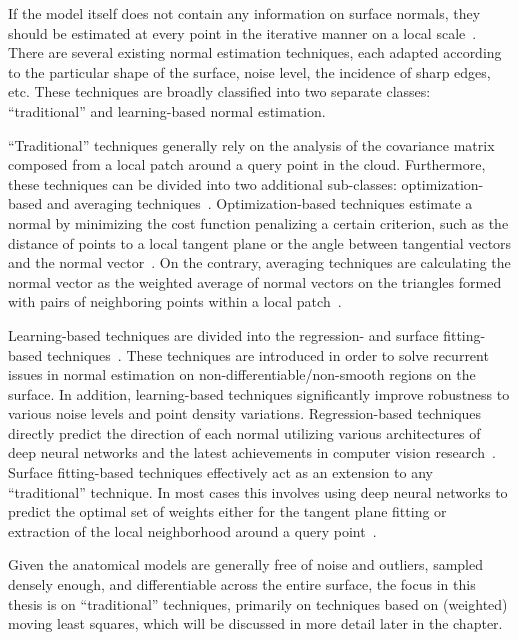 If the model itself does not contain any information on surface normals, they should be estimated at every point in the iterative manner on a local scale~\cite{Berger2017survey}.
There are several existing normal estimation techniques, each adapted according to the particular shape of the surface, noise level, the incidence of sharp edges, etc.
These techniques are broadly classified into two separate classes: ``traditional'' and learning-based normal estimation.

``Traditional'' techniques generally rely on the analysis of the covariance matrix composed from a local patch around a query point in the cloud.
Furthermore, these techniques can be divided into two additional sub-classes: optimization-based and averaging techniques~\cite{Klasing2009Comparison}.
Optimization-based techniques estimate a normal by minimizing the cost function penalizing a certain criterion, such as the distance of points to a local tangent plane or the angle between tangential vectors and the normal vector~\cite{Hoppe1992Surface}.
On the contrary, averaging techniques are calculating the normal vector as the weighted average of normal vectors on the triangles formed with pairs of neighboring points within a local patch~\cite{Jin2005comparison}.

Learning-based techniques are divided into the regression- and surface fitting-based techniques~\cite{Wang2015Designing}.
These techniques are introduced in order to solve recurrent issues in normal estimation on non-differentiable/non-smooth regions on the surface.
In addition, learning-based techniques significantly improve robustness to various noise levels and point density variations.
Regression-based techniques directly predict the direction of each normal utilizing various architectures of deep neural networks and the latest achievements in computer vision research~\cite{Charles2017PointNet,Guerrero2018PCPNet,Ben-Shabat2019Nesti-Net,Zhou2023Refine-Net}.
Surface fitting-based techniques effectively act as an extension to any ``traditional'' technique.
In most cases this involves using deep neural networks to predict the optimal set of weights either for the tangent plane fitting or extraction of the local neighborhood around a query point~\cite{Lenssen2020Deep,Ben-Shabat2020DeepFit,Zhu2021AdaFit,Li2022HSurf-Net}.

Given the anatomical models are generally free of noise and outliers, sampled densely enough, and differentiable across the entire surface, the focus in this thesis is on ``traditional'' techniques, primarily on techniques based on (weighted) moving least squares, which will be discussed in more detail later in the chapter.

